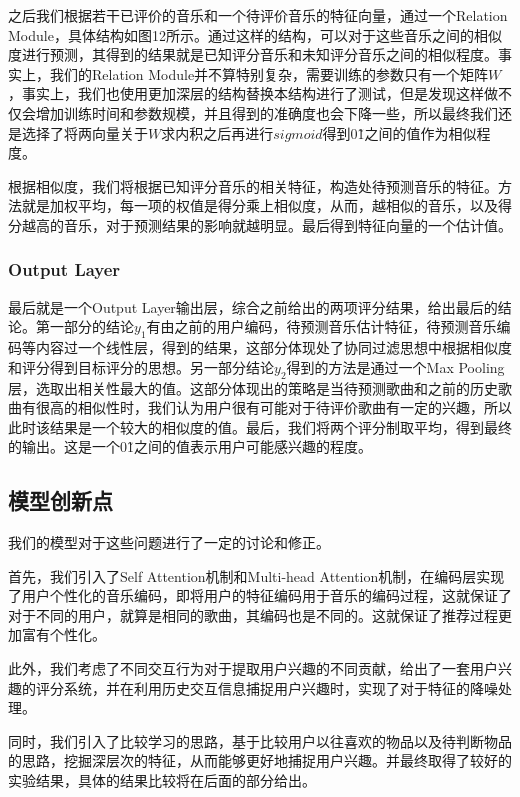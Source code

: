 之后我们根据若干已评价的音乐和一个待评价音乐的特征向量，通过一个Relation Module，具体结构如图12所示。通过这样的结构，可以对于这些音乐之间的相似度进行预测，其得到的结果就是已知评分音乐和未知评分音乐之间的相似程度。事实上，我们的Relation Module并不算特别复杂，需要训练的参数只有一个矩阵$W$，事实上，我们也使用更加深层的结构替换本结构进行了测试，但是发现这样做不仅会增加训练时间和参数规模，并且得到的准确度也会下降一些，所以最终我们还是选择了将两向量关于$W$求内积之后再进行$sigmoid$得到0\~1之间的值作为相似程度。

根据相似度，我们将根据已知评分音乐的相关特征，构造处待预测音乐的特征。方法就是加权平均，每一项的权值是得分乘上相似度，从而，越相似的音乐，以及得分越高的音乐，对于预测结果的影响就越明显。最后得到特征向量的一个估计值。

\subsubsection{Output Layer}
最后就是一个Output Layer输出层，综合之前给出的两项评分结果，给出最后的结论。第一部分的结论$y_1$有由之前的用户编码，待预测音乐估计特征，待预测音乐编码等内容过一个线性层，得到的结果，这部分体现处了协同过滤思想中根据相似度和评分得到目标评分的思想。另一部分结论$y_2$得到的方法是通过一个Max Pooling层，选取出相关性最大的值。这部分体现出的策略是当待预测歌曲和之前的历史歌曲有很高的相似性时，我们认为用户很有可能对于待评价歌曲有一定的兴趣，所以此时该结果是一个较大的相似度的值。最后，我们将两个评分制取平均，得到最终的输出。这是一个0\~1之间的值表示用户可能感兴趣的程度。

\subsection{模型创新点}
我们的模型对于这些问题进行了一定的讨论和修正。

首先，我们引入了Self Attention机制和Multi-head Attention机制\cite{vaswani2017attention}，在编码层实现了用户个性化的音乐编码，即将用户的特征编码用于音乐的编码过程，这就保证了对于不同的用户，就算是相同的歌曲，其编码也是不同的。这就保证了推荐过程更加富有个性化。

此外，我们考虑了不同交互行为对于提取用户兴趣的不同贡献，给出了一套用户兴趣的评分系统，并在利用历史交互信息捕捉用户兴趣时，实现了对于特征的降噪处理。

同时，我们引入了比较学习的思路，基于比较用户以往喜欢的物品以及待判断物品的思路，挖掘深层次的特征，从而能够更好地捕捉用户兴趣。并最终取得了较好的实验结果，具体的结果比较将在后面的部分给出。